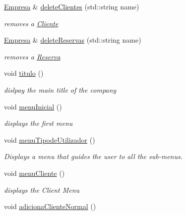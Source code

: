 \begin{DoxyCompactItemize}
\hyperlink{classEmpresa}{Empresa} \& \hyperlink{classEmpresa_a52b9f4d94c2a05704d74854ed4dd1590}{delete\+Clientes} (std\+::string name)
\begin{DoxyCompactList}\small\item\em removes a \hyperlink{classCliente}{Cliente} \end{DoxyCompactList}\item 
\hyperlink{classEmpresa}{Empresa} \& \hyperlink{classEmpresa_a079c008b006f56faac3c1016fe770e8c}{delete\+Reservas} (std\+::string name)
\begin{DoxyCompactList}\small\item\em removes a \hyperlink{classReserva}{Reserva} \end{DoxyCompactList}\item 
void \hyperlink{classEmpresa_ad79f7196a8ce7256771cbd7b9542155c}{titulo} ()
\begin{DoxyCompactList}\small\item\em dislpay the main title of the company \end{DoxyCompactList}\item 
\mbox{\label{classEmpresa_ad77cdd5a6cbe2beb2078aa6bec2cfe28}} 
void \hyperlink{classEmpresa_ad77cdd5a6cbe2beb2078aa6bec2cfe28}{menu\+Inicial} ()
\begin{DoxyCompactList}\small\item\em displays the first menu \end{DoxyCompactList}\item 
\mbox{\label{classEmpresa_a544832c17fe7d592ae1d01bdc144059e}} 
void \hyperlink{classEmpresa_a544832c17fe7d592ae1d01bdc144059e}{menu\+Tipode\+Utilizador} ()
\begin{DoxyCompactList}\small\item\em Displays a menu that guides the user to all the sub-\/menus. \end{DoxyCompactList}\item 
void \hyperlink{classEmpresa_a2e8e13ecd162403da0118ceccdccbbcb}{menu\+Cliente} ()
\begin{DoxyCompactList}\small\item\em displays the Client Menu \end{DoxyCompactList}\item 
\mbox{\label{classEmpresa_a372599c8aee20690517cc3ae6c8e1ca7}} 
void \hyperlink{classEmpresa_a372599c8aee20690517cc3ae6c8e1ca7}{adiciona\+Cliente\+Normal} ()

\end{DoxyCompactItemize}
